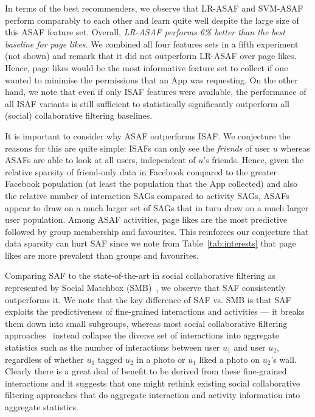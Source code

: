 In terms of the best recommenders, we observe that LR-ASAF and
SVM-ASAF perform comparably to each other and learn quite well despite
the large size of this ASAF feature set.  Overall, \emph{LR-ASAF
  performs 6\% better than the best baseline for page likes}.  We
combined all four features sets in a fifth experiment (not shown) and
remark that it did not outperform LR-ASAF over page
likes.  Hence, page likes would be the most informative
feature set to collect if one wanted to minimise the permissions that
an App was requesting.  On the other hand, we note that even if only
ISAF features were available, the performance of all ISAF variants is
still sufficient to statistically significantly outperform all
(social) collaborative filtering baselines.

It is important to consider why ASAF outperforms ISAF.  We conjecture
the reasons for this are quite simple: ISAFs can only see the
\emph{friends} of user $u$ whereas ASAFs are able to look at all
users, independent of $u$'s friends.  Hence, given the relative
sparsity of friend-only data in Facebook compared to the greater
Facebook population (at least the population that the App collected)
and also the relative number of interaction SAGs compared to
activity SAGs, ASAFs appear to draw on a much larger set of SAGs that
in turn draw on a much larger user population.  Among ASAF activities,
page likes are the most predictive followed by group membership and
favourites.  This reinforces our conjecture that data sparsity 
can hurt SAF since we note from Table~\ref{tab:interests} that page likes are
more prevalent than groups and favourites.

Comparing SAF to the state-of-the-art in social collaborative
filtering as represented by Social Matchbox (SMB)~\cite{Noel2012NOF},
we observe that SAF consistently outperforms it.  We note that the key
difference of SAF vs. SMB is that SAF exploits the predictiveness of
fine-grained interactions and activities --- it breaks them down into
small subgroups, whereas most 
social collaborative filtering approaches~\cite{socinf,rrmf,ste,sorec,sr,Noel2012NOF,lla} instead
collapse the diverse set of interactions into aggregate statistics
such as the number of interactions between user $u_1$ and user $u_2$,
regardless of whether $u_1$ tagged $u_2$ in a photo or $u_1$ liked a
photo on $u_2$'s wall.  Clearly there is a great deal of benefit to be
derived from these fine-grained interactions and it suggests that one
might rethink existing social collaborative filtering approaches that
do aggregate interaction and activity information into aggregate
statistics.

